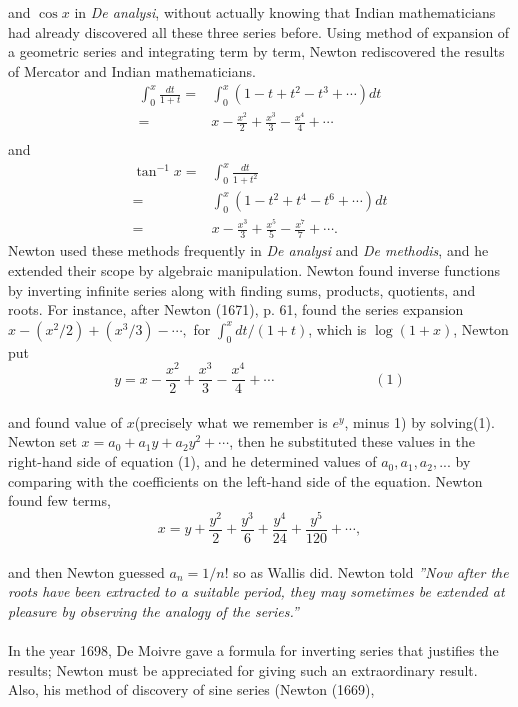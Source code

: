 \documentclass[a4paper,reqno,11pt]{amsart}
\theoremstyle{plain}%
\begin{document}
and $\cos x$ in \textit{De analysi}, without actually knowing that Indian mathematicians had already discovered all these three series before.
Using method of expansion of a geometric series and integrating term by term, Newton rediscovered the results of Mercator and Indian mathematicians.\\
\begin{align*}
\int_{0}^{x} \frac{dt}{1+t} =& \int_{0}^{x}( 1 - t + t^2 - t^3 + \cdots)dt\\
=& x - \frac{x^2}{2} + \frac{x^3}{3} - \frac{x^4}{4} + \cdots\\
\end{align*}
and
\begin{align*}
\tan^{-1}x =& \int_{0}^{x}\frac{dt}{1+t^2}\\
=& \int_{0}^{x} (1 - t^2 + t^4 - t^6 + \cdots)dt\\
=& x - \frac{x^3}{3} + \frac{x^5}{5} - \frac{x^7}{7} + \cdots.
\end{align*}
Newton used these methods frequently in \textit{De analysi} and \textit{De methodis}, and he extended their scope by algebraic manipulation. Newton found inverse functions by inverting infinite series along with finding sums,
products, quotients, and roots. For instance, after Newton (1671), p. 61, found the series expansion $x - (x^2/2) + (x^3/3) - \cdots,$
for $\int_{0}^{x} dt/(1 + t)$, which is $\log(1 + x)$, Newton put\\
$$y = x - \frac{x^2}{2} + \frac{x^3}{3} - \frac{x^4}{4} + \cdots \hspace{3cm} (1)$$\\
and found value of $x$(precisely what we remember is $e^{y}$, minus 1) by solving(1). Newton set $x = a_{0} + a_{1}y + a_{2}y^2 + \cdots$, then he substituted these values in the right-hand side of equation (1), and he determined values of  $a_{0}, a_{1}, a_{2},...$
by comparing with the coefficients on the left-hand side of the equation.
Newton found few terms,\\
$$x = y + \frac{y^2}{2} + \frac{y^3}{6} + \frac{y^4}{24} + \frac{y^5}{120} + \cdots,$$\\
and then Newton guessed $a_{n} = 1/n!$ so as Wallis did. Newton told \textit{''Now after the roots have been extracted to a suitable period, they may
sometimes be extended at pleasure by observing the analogy of the series.”}\\
\\
\indent In the year 1698, De Moivre gave a formula for inverting series that justifies the results; Newton must be appreciated for giving such an extraordinary result. Also, his method of discovery of sine series (Newton (1669),
\end{document}

